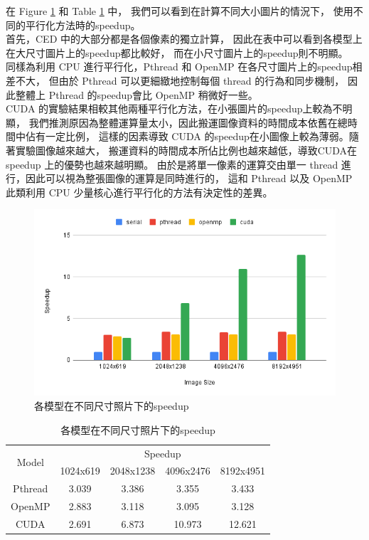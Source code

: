 \documentclass[sigconf,nonacm]{acmart}
\begin{document}
在 Figure \ref{fig:all_model} 和 Table \ref{tab:all_model} 中，
我們可以看到在計算不同大小圖片的情況下，
使用不同的平行化方法時的speedup。\\
首先，CED 中的大部分都是各個像素的獨立計算，
因此在表中可以看到各模型上在大尺寸圖片上的speedup都比較好，
而在小尺寸圖片上的speedup則不明顯。\\
同樣為利用 CPU 進行平行化，Pthread 和 OpenMP 在各尺寸圖片上的speedup相差不大，
但由於 Pthread 可以更細緻地控制每個 thread 的行為和同步機制，
因此整體上 Pthread 的speedup會比 OpenMP 稍微好一些。\\
CUDA 的實驗結果相較其他兩種平行化方法，在小張圖片的speedup上較為不明顯，
我們推測原因為整體運算量太小，因此搬運圖像資料的時間成本依舊在總時間中佔有一定比例，
這樣的因素導致 CUDA 的speedup在小圖像上較為薄弱。隨著實驗圖像越來越大，
搬運資料的時間成本所佔比例也越來越低，導致CUDA在 speedup 上的優勢也越來越明顯。
由於是將單一像素的運算交由單一 thread 進行，因此可以視為整張圖像的運算是同時進行的，
這和 Pthread 以及 OpenMP 此類利用 CPU 少量核心進行平行化的方法有決定性的差異。

\begin{figure}[htbp]
  \centering
  \includegraphics[width=\linewidth]{"./image/all_model.png"}
  \caption{各模型在不同尺寸照片下的speedup}
  \label{fig:all_model}
\end{figure}

\begin{table}[htbp]
  \centering
  \begin{tabular}{|c|c|c|c|c|}
  \hline
  \multirow{2}{*}{Model} & \multicolumn{4}{c|}{Speedup} \\ \cline{2-5} 
                         & 1024x619    & 2048x1238   & 4096x2476   & 8192x4951  \\ \hline
  Pthread                & 3.039       & 3.386       & 3.355       & 3.433      \\ \hline
  OpenMP                 & 2.883       & 3.118       & 3.095       & 3.128      \\ \hline
  CUDA                   & 2.691       & 6.873       & 10.973      & 12.621     \\ \hline
  \end{tabular}
  \caption{各模型在不同尺寸照片下的speedup}
  \label{tab:all_model}
\end{table}
\end{document}
